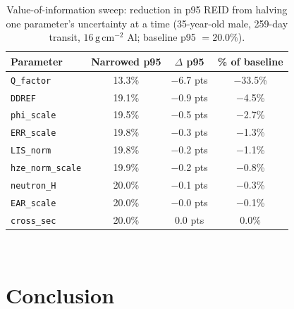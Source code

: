 \documentclass[a4paper,fleqn]{cas-dc}
\newcommand{\gcm}{\,\mathrm{g\,cm^{-2}}}
\newcommand{\code}[1]{\texttt{#1}}
\begin{document}
\begin{table}[t]
  \centering
  \caption{Value-of-information sweep: reduction in p95 REID from halving
           one parameter's uncertainty at a time (35-year-old male,
           259-day transit, $16\gcm$ Al; baseline p95 $=20.0\%$).}
  \label{tab:vov}
  \small
  \begin{tabular*}{\tblwidth}{@{}LCCC@{}}
    \toprule
    Parameter & Narrowed p95 & $\Delta$ p95 & \% of baseline \\
    \midrule
    \code{Q\_factor}       & 13.3\% & $-$6.7 pts & $-$33.5\% \\
    \code{DDREF}           & 19.1\% & $-$0.9 pts & $ -$4.5\%  \\
    \code{phi\_scale}      & 19.5\% & $-$0.5 pts & $-$2.7\%  \\
    \code{ERR\_scale}      & 19.8\% & $-$0.3 pts & $-$1.3\%  \\
    \code{LIS\_norm}       & 19.8\% & $-$0.2 pts & $-$1.1\%  \\
    \code{hze\_norm\_scale}& 19.9\% & $-$0.2 pts & $-$0.8\%  \\
    \code{neutron\_H}      & 20.0\% & $-$0.1 pts & $-$0.3\%  \\
    \code{EAR\_scale}      & 20.0\% & $-$0.0 pts & $-$0.1\%  \\
    \code{cross\_sec}      & 20.0\% & $0.0$ pts  & $0.0\%$   \\
    \bottomrule
  \end{tabular*}
\end{table}


\\

\section{Conclusion}
\label{sec:conclusion}
\end{document}
